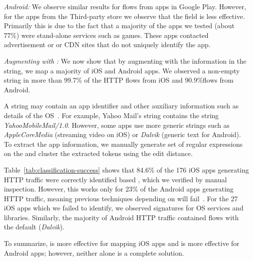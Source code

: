 \emph{Android:} We observe similar results for flows from apps in Google Play.
However, for the apps from the Third-party store we observe that the \httphost field is less effective. 
Primarily this is due to the fact that a majority of the apps we tested (about 77\%) were stand-alone services such as games. 
These apps contacted advertisement or or CDN sites that do not uniquely identify the app.

\emph{Augmenting with \useragent: } We now show that by augmenting \httphost with the information in the \useragent string, we map a majority of iOS and Android apps. 
We observed a non-empty \useragent string in more than 99.7\% of the HTTP flows from iOS and 90.9\%flows from Android. 

A \useragent string may contain an app identifier and other auxiliary information such as details of the OS~\cite{mozilla:useragentdetection}. 
For example, Yahoo Mail's \useragent string contains the string \emph{YahooMobileMail/1.0}. 
However, some apps use more generic \useragent strings such as \emph{AppleCoreMedia} (streaming video on iOS) or \emph{Dalvik} (generic text for Android). 
To extract the app information, we manually generate set of regular expressions on the \useragent and cluster the extracted tokens using the edit distance.

Table~\ref{tab:classification-success} shows that 84.6\% of the 176 iOS apps generating HTTP traffic were correctly identified based \useragent, which we verified by manual inspection.
However, this works only for 23\% of the Android apps generating HTTP traffic, meaning previous techniques depending on \useragent will fail~\cite{maier:mobtraffic,xu:appusage,falaki:mobileusage,falaki:smartphoneusage}. 
For the 27 iOS apps which we failed to identify, we observed signatures for OS services and libraries.
Similarly, the majority of Android HTTP traffic contained flows with the default \useragent (\emph{Dalvik}).

To summarize, \useragent is more effective for mapping iOS apps and \httphost is more effective for Android apps; however, neither alone is a complete solution. 

